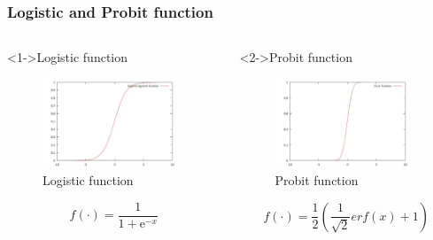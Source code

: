 \documentclass[english,10pt,presentation]{beamer}
\begin{document}
\begin{frame}
\frametitle{Logistic and Probit function}
\label{sec-3_2}
\begin{columns}
\begin{column}{0.5\textwidth}
\begin{exampleblock}<1->{Logistic function}
\label{sec-3_2_1}

    \begin{figure}[htb]
    \centering
    \includegraphics[width=4cm,angle=0]{./logistic.jpg}
    \caption{\label{fig:log}Logistic function}
    \end{figure}
\begin{displaymath}
f(\cdot) = \frac{1}{1+\mathrm{e}^{-x}}
\end{displaymath}
\end{exampleblock}
\end{column}
\begin{column}{0.5\textwidth}
\begin{exampleblock}<2->{Probit function}
\label{sec-3_2_2}

    \begin{figure}[htb]
    \centering
    \includegraphics[width=4cm,angle=0]{./erf.jpg}
    \caption{\label{fig: probit}Probit function}
    \end{figure}
\begin{displaymath}
f(\cdot) = \frac{1}{2}(\frac{1}{\sqrt{2}}erf(x) + 1)
\end{displaymath}
\end{exampleblock}
\end{column}
\end{columns}
\end{frame}
\end{document}
